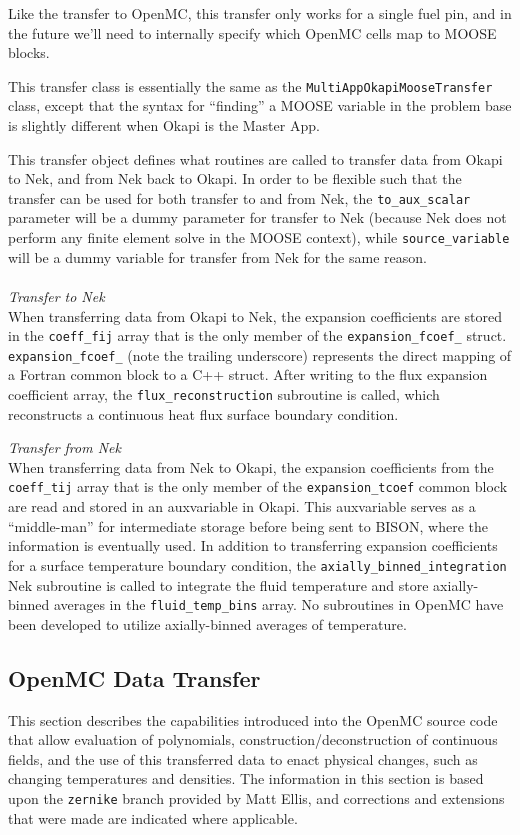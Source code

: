 \documentclass[10pt]{article}
\newcounter{subsubsubsection}[subsubsection]
\numberwithin{equation}{section} %
\begin{document}
\color{magenta}
Like the transfer to OpenMC, this transfer only works for a single fuel pin, and in the future we'll need to internally specify which OpenMC cells map to MOOSE blocks.
\color{black}

This transfer class is essentially the same as the {\tt MultiAppOkapiMooseTransfer} class, except that the syntax for ``finding'' a MOOSE variable in the problem base is slightly different when Okapi is the Master App. 

This transfer object defines what routines are called to transfer data from Okapi to Nek, and from Nek back to Okapi. In order to be flexible such that the transfer can be used for both transfer to and from Nek, the {\tt to\_aux\_scalar} parameter will be a dummy parameter for transfer to Nek (because Nek does not perform any finite element solve in the MOOSE context), while {\tt source\_variable} will be a dummy variable for transfer from Nek for the same reason.
\\\\
{\it Transfer to Nek}\\
When transferring data from Okapi to Nek, the expansion coefficients are stored in the {\tt coeff\_fij} array that is the only member of the {\tt expansion\_fcoef\_} struct. {\tt expansion\_fcoef\_} (note the trailing underscore) represents the direct mapping of a Fortran common block to a C++ struct. After writing to the flux expansion coefficient array, the {\tt flux\_reconstruction} subroutine is called, which reconstructs a continuous heat flux surface boundary condition.

{\it Transfer from Nek}\\
When transferring data from Nek to Okapi, the expansion coefficients from the {\tt coeff\_tij} array that is the only member of the {\tt expansion\_tcoef} common block are read and stored in an auxvariable in Okapi. This auxvariable serves as a ``middle-man'' for intermediate storage before being sent to BISON, where the information is eventually used. In addition to transferring expansion coefficients for a surface temperature boundary condition, the {\tt axially\_binned\_integration} Nek subroutine is called to integrate the fluid temperature and store axially-binned averages in the {\tt fluid\_temp\_bins} array. No subroutines in OpenMC have been developed to utilize axially-binned averages of temperature.

\subsection{OpenMC Data Transfer}
\label{sec:OpenMCTransfer}
This section describes the capabilities introduced into the OpenMC source code that allow evaluation of polynomials, construction/deconstruction of continuous fields, and the use of this transferred data to enact physical changes, such as changing temperatures and densities. The information in this section is based upon the {\tt zernike} branch provided by Matt Ellis, and corrections and extensions that were made are indicated where applicable.
\end{document}
